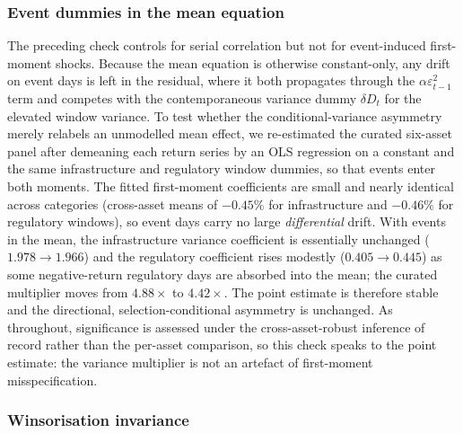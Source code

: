 \documentclass[pdflatex,sn-mathphys-num]{sn-jnl}
\theoremstyle{thmstyleone}
\theoremstyle{thmstyletwo}
\theoremstyle{thmstylethree}
\begin{document}
\subsubsection{Event dummies in the mean equation}\label{sec:event_in_mean}

The preceding check controls for serial correlation but not for event-induced first-moment shocks. Because the mean equation is otherwise constant-only, any drift on event days is left in the residual, where it both propagates through the $\alpha\varepsilon_{t-1}^2$ term and competes with the contemporaneous variance dummy $\delta D_t$ for the elevated window variance. To test whether the conditional-variance asymmetry merely relabels an unmodelled mean effect, we re-estimated the curated six-asset panel after demeaning each return series by an OLS regression on a constant and the same infrastructure and regulatory window dummies, so that events enter both moments. The fitted first-moment coefficients are small and nearly identical across categories (cross-asset means of $-0.45\%$ for infrastructure and $-0.46\%$ for regulatory windows), so event days carry no large \emph{differential} drift. With events in the mean, the infrastructure variance coefficient is essentially unchanged ($1.978\rightarrow 1.966$) and the regulatory coefficient rises modestly ($0.405\rightarrow 0.445$) as some negative-return regulatory days are absorbed into the mean; the curated multiplier moves from $4.88\times$ to $4.42\times$. The point estimate is therefore stable and the directional, selection-conditional asymmetry is unchanged. As throughout, significance is assessed under the cross-asset-robust inference of record rather than the per-asset comparison, so this check speaks to the point estimate: the variance multiplier is not an artefact of first-moment misspecification.

\subsubsection{Winsorisation invariance}
\end{document}
